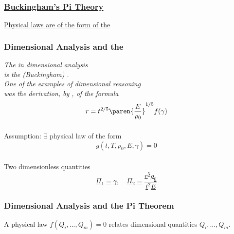 %
\begin{frame}\frametitle{\href{https://scienceworld.wolfram.com/physics/BuckinghamsPiTheorem.html}{Buckingham's Pi Theory}}
\center
\href{https://en.wikipedia.org/wiki/Buckingham_\%CF\%80_theorem}{
Physical laws are  of the form of the 
}
\end{frame}
%
%
\begin{frame}\frametitle{Dimensional Analysis and the }
\center
	\href{https://www.sciencedirect.com/science/article/pii/0024379582902294}{
	\begin{overpic}[ scale = 0.75 ]
		{\pLocalGraphics curtis-pi-03}
	\end{overpic}}
	\ \\
	\cite{curtis1982dimensional}
\end{frame}
%
\begin{frame}\frametitle{Dimensional Analysis and the }
\center
	\emph{The  in dimensional analysis\\ is the (Buckingham) .}\\[20pt]
	\pause
	\emph{One of the  examples of dimensional reasoning\\ was the derivation, by , of the formula}
\begin{equation}
	r= t^{2/5}\paren{\frac{E}{\rho_{0}}}^{1/5} f(\gamma)
\label{eq:curtis-example}
\end{equation}
\end{frame}
%
\begin{frame}\frametitle{\pititle}
\center 
Assumption: $\exists$ physical law of the form 
\begin{equation}
	g(t, T, \rho_{0}, E, \gamma) = 0
\label{eq:curtis-Assumption}
\end{equation}
\end{frame}
%
\begin{frame}\frametitle{\pititle}
\center 
Two dimensionless quantities
\href{https://pdf.sciencedirectassets.com/271586/1-s2.0-S0024379500X02728/1-s2.0-0024379582902294/main.pdf\#page=2}{
\begin{equation}
	\Pi_{1} = \gamma, \quad \Pi_{2} = \frac{r^{5}\rho_{0}} {t^{2} E}
\label{eq:pi}
\end{equation}
}
\end{frame}
%
%
\begin{frame}\frametitle{Dimensional Analysis and the Pi Theorem}
	\begin{definition}
		A physical law  $f( Q_{i}, . . . , Q_{m}) = 0$ relates dimensional quantities $Q_{i}, . . . , Q_{m}$. 
	\end{definition}
\end{frame}
